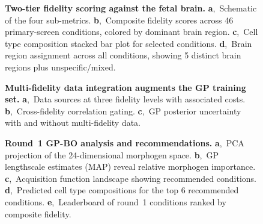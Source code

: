 \documentclass[times,twoside]{zHenriquesLab-StyleBioRxiv}
\begin{document}
\begin{figure}[tbp]
\centering
{}
\caption{\textbf{Two-tier fidelity scoring against the fetal brain.}
\textbf{a},~Schematic of the four sub-metrics.
\textbf{b},~Composite fidelity scores across 46 primary-screen conditions, colored by dominant brain region.
\textbf{c},~Cell type composition stacked bar plot for selected conditions.
\textbf{d},~Brain region assignment across all conditions, showing 5 distinct brain regions plus unspecific/mixed.}
\label{fig:fidelity}
\end{figure}

\begin{figure}[tbp]
\centering
{}
\caption{\textbf{Multi-fidelity data integration augments the GP training set.}
\textbf{a},~Data sources at three fidelity levels with associated costs.
\textbf{b},~Cross-fidelity correlation gating.
\textbf{c},~GP posterior uncertainty with and without multi-fidelity data.}
\label{fig:multifidelity}
\end{figure}

\begin{figure}[tbp]
\centering
{}
\caption{\textbf{Round~1 GP-BO analysis and recommendations.}
\textbf{a},~PCA projection of the 24-dimensional morphogen space.
\textbf{b},~GP lengthscale estimates (MAP) reveal relative morphogen importance.
\textbf{c},~Acquisition function landscape showing recommended conditions.
\textbf{d},~Predicted cell type compositions for the top 6 recommended conditions.
\textbf{e},~Leaderboard of round~1 conditions ranked by composite fidelity.}
\label{fig:results}
\end{figure}
\end{document}
